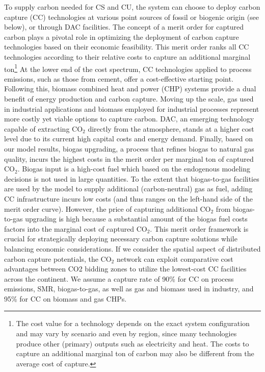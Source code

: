 \documentclass[twocolumn]{article}
\newcommand{\COtwo}{CO$_2$}
\begin{document}

To supply carbon needed for CS and CU, the system can choose to deploy carbon capture (CC) technologies at various point sources of fossil or biogenic origin (see below), or through DAC facilities.
The concept of a merit order for captured carbon plays a pivotal role in optimizing the deployment of carbon capture technologies based on their economic feasibility.
This merit order ranks all CC technologies according to their relative costs to capture an additional marginal ton\footnote[2]{The cost value for a technology depends on the exact system configuration and may vary by scenario and even by region, since many technologies produce other (primary) outputs such as electricity and heat. The costs to capture an additional marginal ton of carbon may also be different from the average cost of capture.}
At the lower end of the cost spectrum, CC technologies applied to process emissions, such as those from cement, offer a cost-effective starting point.
Following this, biomass combined heat and power (CHP) systems provide a dual benefit of energy production and carbon capture.
Moving up the scale, gas used in industrial applications and biomass employed for industrial processes represent more costly yet viable options to capture carbon.
DAC, an emerging technology capable of extracting \COtwo{} directly from the atmosphere, stands at a higher cost level due to its current high capital costs and energy demand.
Finally, based on our model results, biogas upgrading, a process that refines biogas to natural gas quality, incurs the highest costs in the merit order per marginal ton of captured \COtwo{}.
Biogas input is a high-cost fuel which based on the endogenous modeling decisions is not used in large quantities.
To the extent that biogas-to-gas facilities are used by the model to supply additional (carbon-neutral) gas as fuel, adding CC infrastructure incurs low costs (and thus ranges on the left-hand side of the merit order curve).
However, the price of capturing additional \COtwo{} from biogas-to-gas upgrading is high because a substantial amount of the biogas fuel costs factors into the marginal cost of captured \COtwo{}.
This merit order framework is crucial for strategically deploying necessary carbon capture solutions while balancing economic considerations.
If we consider the spatial aspect of distributed carbon capture potentials, the \COtwo{} network can exploit comparative cost advantages between CO2 bidding zones to utilize the lowest-cost CC facilities across the continent.
We assume a capture rate of 90\% for CC on process emissions, SMR, biogas-to-gas, as well as gas and biomass used in industry, and 95\% for CC on biomass and gas CHPs.
\end{document}
